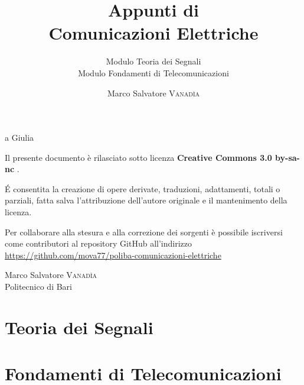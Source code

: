 \documentclass[10pt,a4paper,onecolumn,titlepage,twoside,openright,final]{book}
\title{Appunti di \\ Comunicazioni Elettriche}
\subtitle{Modulo Teoria dei Segnali\\Modulo Fondamenti di Telecomunicazioni}
\author{Marco Salvatore \textsc{Vanad\`{i}a}}
\begin{document}
\frontmatter
\maketitle
\newpage

\null{}
\begin{flushright}a Giulia\end{flushright}
\null
\vfill
Il presente documento è rilasciato sotto licenza \ccLogo \textbf{Creative Commons 3.0 by-sa-nc} \ccbyncsa.

\'{E} consentita la creazione di opere derivate, traduzioni, adattamenti, totali o parziali, fatta salva l'attribuzione dell'autore originale e il mantenimento della licenza.

Per collaborare alla stesura e alla correzione dei sorgenti è possibile iscriversi come contributori al repository GitHub all'indirizzo \url{https://github.com/mova77/poliba-comunicazioni-elettriche}

Marco Salvatore \textsc{Vanadìa}\\Politecnico di Bari
\cleardoublepage\clearpage{\pagestyle{empty}\cleardoublepage}

\tableofcontents

\mainmatter
\part{Teoria dei Segnali}










\part{Fondamenti di Telecomunicazioni}








{}

{}
\printindex
{}
{}
\listoffigures
%
\end{document}
